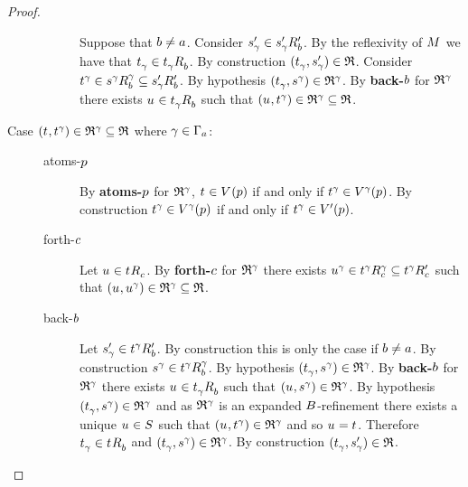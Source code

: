 \begin{proof}
\begin{description}
\begin{description}
                Suppose that $\agentB \neq \agentA$.
                Consider $\kStateSP_\gamma \in \kSuccessorsPB{\kStateSP_\gamma}$.
                By the reflexivity of $\kModel$ we have that $\kStateT_\gamma \in \kSuccessorsB{\kStateT_\gamma}$.
                By construction $(\kStateT_\gamma, \kStateSP_\gamma) \in \refinement$.
                Consider $\kStateT[\gamma] \in \kSuccessorsB[\gamma]{\kStateS[\gamma]} \subseteq \kSuccessorsPB{\kStateSP_\gamma}$.
                By hypothesis $(\kStateT_\gamma, \kStateS[\gamma]) \in \refinement^\gamma$.
                By {\bf back-$\agentB$} for $\refinement^\gamma$ there exists $\kStateU \in \kSuccessorsB{\kStateT_\gamma}$ such that $(\kStateU, \kStateT[\gamma]) \in \refinement^\gamma \subseteq \refinement$.
        \end{description}
    \item[{Case $(\kStateT, \kStateT[\gamma]) \in \refinement^\gamma \subseteq \refinement$ where $\gamma \in \Gamma_\agentA$:}]
        \hfill
        \begin{description}
            \item[atoms-$\atomP$] 
                By {\bf atoms-$\atomP$} for $\refinement^\gamma$, $\kStateT \in \kValuation(\atomP)$ if and only if $\kStateT[\gamma] \in \kValuation[\gamma](\atomP)$.
                By construction $\kStateT[\gamma] \in \kValuation[\gamma](\atomP)$ if and only if $\kStateT[\gamma] \in \kValuationP(\atomP)$.
            \item[forth-$\agentC$]
                Let $\kStateU \in \kSuccessorsC{\kStateT}$.
                By {\bf forth-$\agentC$} for $\refinement^\gamma$ there exists $\kStateU[\gamma] \in \kSuccessorsC[\gamma]{\kStateT[\gamma]} \subseteq \kSuccessorsPC{\kStateT[\gamma]}$ such that $(\kStateU, \kStateU[\gamma]) \in \refinement^\gamma \subseteq \refinement$.
            \item[back-$\agentB$]
                Let $\kStateSP_\gamma \in \kSuccessorsPB{\kStateT[\gamma]}$.
                By construction this is only the case if $\agentB \neq \agentA$.
                By construction $\kStateS[\gamma] \in \kSuccessorsB[\gamma]{\kStateT[\gamma]}$.
                By hypothesis $(\kStateT_\gamma, \kStateS[\gamma]) \in \refinement^\gamma$.
                By {\bf back-$\agentB$} for $\refinement^\gamma$ there exists $\kStateU \in \kSuccessorsB{\kStateT_\gamma}$ such that $(\kStateU, \kStateS[\gamma]) \in \refinement^\gamma$.
                By hypothesis $(\kStateT_\gamma, \kStateS[\gamma]) \in \refinement^\gamma$ and as $\refinement^\gamma$ is an expanded $\agentsB$-refinement there exists a unique $\kStateU \in \kStates$ such that $(\kStateU, \kStateT[\gamma]) \in \refinement^\gamma$ and so $\kStateU = \kStateT$.
                Therefore $\kStateT_\gamma \in \kSuccessorsB{\kStateT}$ and $(\kStateT_\gamma, \kStateS[\gamma]) \in \refinement^\gamma$.
                By construction $(\kStateT_\gamma, \kStateSP_\gamma) \in \refinement$.


\end{description}
\end{description}
\end{proof}
